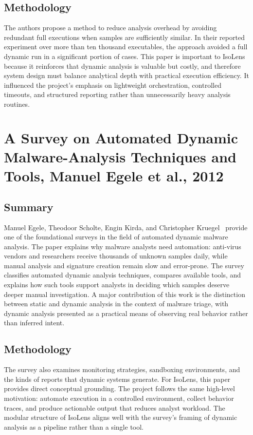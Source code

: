 \documentclass[a4paper,12pt,oneside]{report}
\begin{document}
\subsection{Methodology}
The authors propose a method to reduce analysis overhead by avoiding redundant full executions when samples are sufficiently similar. In their reported experiment over more than ten thousand executables, the approach avoided a full dynamic run in a significant portion of cases. This paper is important to IsoLens because it reinforces that dynamic analysis is valuable but costly, and therefore system design must balance analytical depth with practical execution efficiency. It influenced the project’s emphasis on lightweight orchestration, controlled timeouts, and structured reporting rather than unnecessarily heavy analysis routines.

\section{A Survey on Automated Dynamic Malware-Analysis Techniques and Tools, Manuel Egele et al., 2012}

\subsection{Summary}
Manuel Egele, Theodoor Scholte, Engin Kirda, and Christopher Kruegel~\cite{egele2022} provide one of the foundational surveys in the field of automated dynamic malware analysis. The paper explains why malware analysts need automation: anti-virus vendors and researchers receive thousands of unknown samples daily, while manual analysis and signature creation remain slow and error-prone. The survey classifies automated dynamic analysis techniques, compares available tools, and explains how such tools support analysts in deciding which samples deserve deeper manual investigation. A major contribution of this work is the distinction between static and dynamic analysis in the context of malware triage, with dynamic analysis presented as a practical means of observing real behavior rather than inferred intent.

\subsection{Methodology}
The survey also examines monitoring strategies, sandboxing environments, and the kinds of reports that dynamic systems generate. For IsoLens, this paper provides direct conceptual grounding. The project follows the same high-level motivation: automate execution in a controlled environment, collect behavior traces, and produce actionable output that reduces analyst workload. The modular structure of IsoLens aligns well with the survey’s framing of dynamic analysis as a pipeline rather than a single tool.
\end{document}

